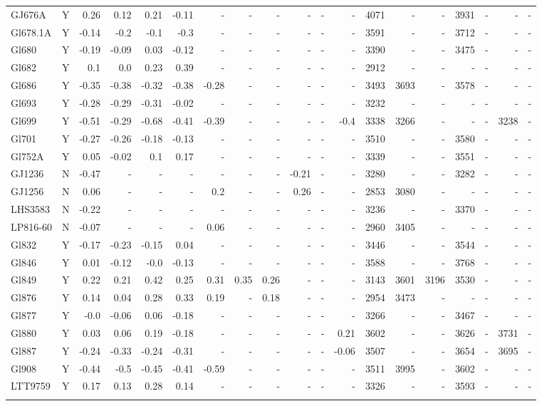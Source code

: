 \documentclass[referee]{aa}
\begin{document}
{\begin{landscape}
{\begin{longtable}{l c r r r r r r r r r r | r r r r r r r }
GJ676A & Y & 0.26 & 0.12 & 0.21 & -0.11 & - & - & - & - & - & - & 4071 & - & - & 3931 & - & - & - \\
Gl678.1A & Y & -0.14 & -0.2 & -0.1 & -0.3 & - & - & - & - & - & - & 3591 & - & - & 3712 & - & - & - \\
Gl680 & Y & -0.19 & -0.09 & 0.03 & -0.12 & - & - & - & - & - & - & 3390 & - & - & 3475 & - & - & - \\
Gl682 & Y & 0.1 & 0.0 & 0.23 & 0.39 & - & - & - & - & - & - & 2912 & - & - & - & - & - & - \\
Gl686 & Y & -0.35 & -0.38 & -0.32 & -0.38 & -0.28 & - & - & - & - & - & 3493 & 3693 & - & 3578 & - & - & - \\
Gl693 & Y & -0.28 & -0.29 & -0.31 & -0.02 & - & - & - & - & - & - & 3232 & - & - & - & - & - & - \\
Gl699 & Y & -0.51 & -0.29 & -0.68 & -0.41 & -0.39 & - & - & - & - & -0.4 & 3338 & 3266 & - & - & - & 3238 & - \\
Gl701 & Y & -0.27 & -0.26 & -0.18 & -0.13 & - & - & - & - & - & - & 3510 & - & - & 3580 & - & - & - \\
Gl752A & Y & 0.05 & -0.02 & 0.1 & 0.17 & - & - & - & - & - & - & 3339 & - & - & 3551 & - & - & - \\
GJ1236 & N & -0.47 & - & - & - & - & - & - & -0.21 & - & - & 3280 & - & - & 3282 & - & - & - \\
GJ1256 & N & 0.06 & - & - & - & 0.2 & - & - & 0.26 & - & - & 2853 & 3080 & - & - & - & - & - \\
LHS3583 & N & -0.22 & - & - & - & - & - & - & - & - & - & 3236 & - & - & 3370 & - & - & - \\
LP816-60 & N & -0.07 & - & - & - & 0.06 & - & - & - & - & - & 2960 & 3405 & - & - & - & - & - \\
Gl832 & Y & -0.17 & -0.23 & -0.15 & 0.04 & - & - & - & - & - & - & 3446 & - & - & 3544 & - & - & - \\
Gl846 & Y & 0.01 & -0.12 & -0.0 & -0.13 & - & - & - & - & - & - & 3588 & - & - & 3768 & - & - & - \\
Gl849 & Y & 0.22 & 0.21 & 0.42 & 0.25 & 0.31 & 0.35 & 0.26 & - & - & - & 3143 & 3601 & 3196 & 3530 & - & - & - \\
Gl876 & Y & 0.14 & 0.04 & 0.28 & 0.33 & 0.19 & - & 0.18 & - & - & - & 2954 & 3473 & - & - & - & - & - \\
Gl877 & Y & -0.0 & -0.06 & 0.06 & -0.18 & - & - & - & - & - & - & 3266 & - & - & 3467 & - & - & - \\
Gl880 & Y & 0.03 & 0.06 & 0.19 & -0.18 & - & - & - & - & - & 0.21 & 3602 & - & - & 3626 & - & 3731 & - \\
Gl887 & Y & -0.24 & -0.33 & -0.24 & -0.31 & - & - & - & - & - & -0.06 & 3507 & - & - & 3654 & - & 3695 & - \\
Gl908 & Y & -0.44 & -0.5 & -0.45 & -0.41 & -0.59 & - & - & - & - & - & 3511 & 3995 & - & 3602 & - & - & - \\
LTT9759 & Y & 0.17 & 0.13 & 0.28 & 0.14 & - & - & - & - & - & - & 3326 & - & - & 3593 & - & - & - \\
\label{table:compfull}
\end{longtable}}
\end{landscape}
}
\end{document}
